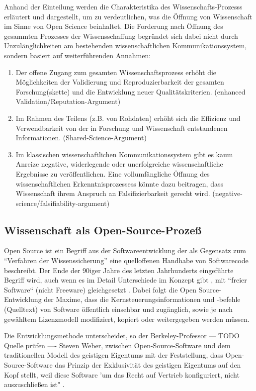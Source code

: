 Anhand der Einteilung werden die Charakteristika des Wissenschafts-Prozesss erläutert und dargestellt, um zu verdeutlichen, was die Öffnung von Wissenschaft im Sinne von Open Science beinhaltet. Die Forderung nach Öffnung des gesammten Prozesses der Wissensschaffung begründet sich dabei nicht durch Unzulänglichkeiten am bestehenden wissenschaftlichen Kommunikationssystem, sondern basiert auf weiterführenden Annahmen:

\begin{enumerate}
\item Der offene Zugang zum gesamten Wissenschaftsprozess erhöht die Möglichkeiten der Validierung und Reproduzierbarkeit der gesamten Forschung(skette) und die Entwicklung neuer Qualitätskriterien. (enhanced Validation/Reputation-Argument)
\item Im Rahmen des Teilens (z.B. von Rohdaten) erhöht sich die Effizienz und Verwendbarkeit von der in Forschung und Wissenschaft entstandenen Informationen. (Shared-Science-Argument)
\item Im klassischen wissenschaftlichen Kommunikationssystem gibt es kaum Anreize negative, widerlegende oder unerfolgreiche wissenschaftliche Ergebnisse zu veröffentlichen. Eine vollumfängliche Öffnung des wissenschaftlichen Erkenntnisprozessess könnte dazu beitragen, dass Wissenschaft ihrem Anspruch an Falsifizierbarkeit gerecht wird. (negative-science/falsifiability-argument)
\end{enumerate}

\subsection{Wissenschaft als Open-Source-Prozeß}

Open Source ist ein Begriff aus der Softwareentwicklung der als Gegensatz zum “Verfahren der Wissenssicherung” \cite{stallman2002} eine quelloffenen Handhabe von Softwarecode beschreibt. Der Ende der 90iger Jahre des letzten Jahrhunderts eingeführte Begriff wird, auch wenn es im Detail Unterschiede im Konzept gibt \cite{suchen}, mit “freier Software“ (nicht Freeware) gleichgesetzt \cite{suchen}. Dabei folgt die Open Source-Entwicklung der Maxime, dass die Kernsteuerungsinformationen und -befehle (Quelltext) von Software öffentlich einsehbar und zugänglich, sowie je nach gewähltem Lizenzmodell modifiziert, kopiert oder weitergegeben werden müssen\cite{suchen}. 

Die Entwicklungsmethode unterscheidet, so der Berkeley-Professor --- TODO Quelle prüfen ---- Steven Weber, zwischen Open-Source-Software und dem traditionellen Modell des geistigen Eigentums mit der Feststellung, dass Open-Source-Software das Prinzip der Exklusivität des geistigen Eigentums auf den Kopf stellt, weil diese Software 'um das Recht auf Vertrieb konfiguriert, nicht auszuschließen ist" \cite{suchen}. 

